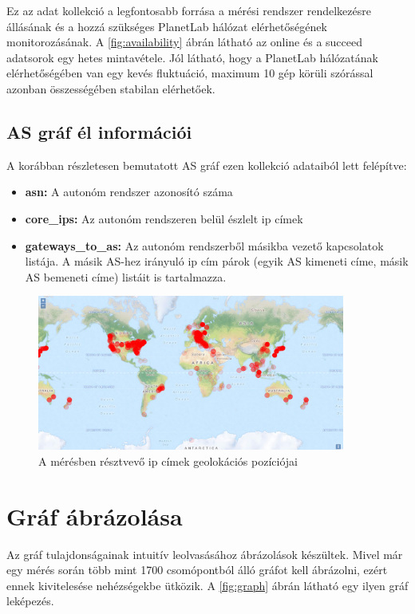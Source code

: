 Ez az adat kollekció a legfontosabb forrása a mérési rendszer rendelkezésre állásának és a hozzá szükséges PlanetLab hálózat elérhetőségének monitorozásának. A \ref{fig:availability} ábrán látható az online és a succeed adatsorok egy hetes mintavétele. Jól látható, hogy a PlanetLab hálózatának elérhetőségében van egy kevés fluktuáció, maximum 10 gép körüli szórással azonban összességében stabilan elérhetőek.


\subsection*{AS gráf él információi}
A korábban részletesen bemutatott AS gráf ezen kollekció adataiból lett felépítve:

\begin{itemize}
\item \textbf{asn:} A autonóm rendszer azonosító száma
\item \textbf{core\_ips:} Az autonóm rendszeren belül észlelt ip címek
\item \textbf{gateways\_to\_as:} Az autonóm rendszerből másikba vezető kapcsolatok listája. A másik AS-hez irányuló ip cím párok (egyik AS kimeneti címe, másik AS bemeneti címe) listáit is tartalmazza.
\end{itemize}



\begin{figure}[h]
	\centering
	\includegraphics[width=0.9\textwidth, keepaspectratio]{figures/ip_map.png}
	\caption{A mérésben résztvevő ip címek geolokációs pozíciójai}
	\label{fig:ip-map}
\end{figure}

\section{Gráf ábrázolása}

Az gráf tulajdonságainak intuitív leolvasásához ábrázolások készültek. Mivel már egy mérés során több mint 1700 csomópontból álló gráfot kell ábrázolni, ezért ennek kivitelesése nehézségekbe ütközik. A \ref{fig:graph} ábrán látható egy ilyen gráf leképezés.

